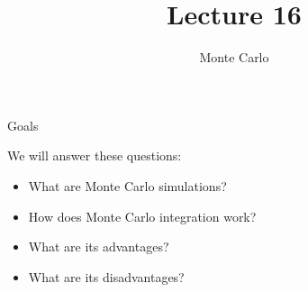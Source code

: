 \documentclass[10pt]{beamer}
\title[CS 357]{Lecture 16}
\subtitle{Monte Carlo}
\begin{document}
\begin{frame}
  \titlepage
\end{frame}
\begin{frame}{Goals}

We will answer these questions:
\begin{itemize}
    \item What are Monte Carlo simulations?
    \item How does Monte Carlo integration work?
    \item What are its advantages?
    \item What are its disadvantages?
\end{itemize}
    
\end{frame}
\end{document}
